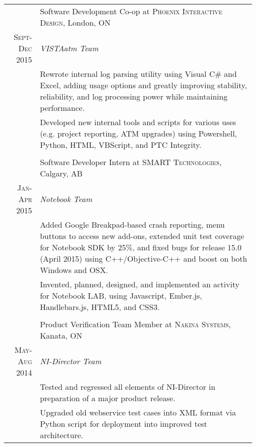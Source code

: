 \documentclass[a4paper,10pt]{article}
\begin{document}
\begin{tabular}{r|p{15.4cm}}
& Software Development Co-op at \textsc{Phoenix Interactive Design}, London, ON\\
\textsc{Sept-Dec 2015} & \emph{VISTAatm Team}\\
&\footnotesize{Rewrote internal log parsing utility using Visual C\# and Excel, adding usage options and greatly improving stability, reliability, and log processing power while maintaining performance.}\\
&\footnotesize{Developed new internal tools and scripts for various uses (e.g. project reporting, ATM upgrades) using Powershell, Python, HTML, VBScript, and PTC Integrity.}\\

\multicolumn{2}{c}{}\\
& Software Developer Intern at \textsc{SMART Technologies}, Calgary, AB \\
\textsc{Jan-Apr 2015}&\emph{Notebook Team}\\
&\footnotesize{
Added Google Breakpad-based crash reporting, menu buttons to access new add-ons, extended unit test coverage for Notebook SDK by 25\%, and fixed bugs for release 15.0 (April 2015) using C++/Objective-C++ and boost on both Windows and OSX.}\\
&\footnotesize{Invented, planned, designed, and implemented an activity for Notebook LAB, using Javascript, Ember.js, Handlebars.js, HTML5, and CSS3.
}\\

\multicolumn{2}{c}{} \\
& Product Verification Team Member at \textsc{Nakina Systems}, Kanata, ON \\
\textsc{May-Aug 2014} & \emph{NI-Director Team}\\
&\footnotesize{Tested and regressed all elements of NI-Director in preparation of a major product release.}\\
&\footnotesize{Upgraded old webservice test cases into XML format via Python script for deployment into improved test architecture.}\\
 
\end{tabular}
\end{document}
